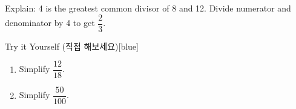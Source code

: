 \documentclass[12pt]{book}
\begin{document}
Explain: 4 is the greatest common divisor of 8 and 12.  
Divide numerator and denominator by 4 to get \(\dfrac{2}{3}\).

\begin{flexbox}{Try it Yourself (직접 해보세요)}[blue]
\begin{enumerate}
  \item Simplify $\dfrac{12}{18}$. \vspace*{20pt}
  \item Simplify $\dfrac{50}{100}$. \vspace*{20pt}
\end{enumerate}
\end{flexbox}













\end{document}
